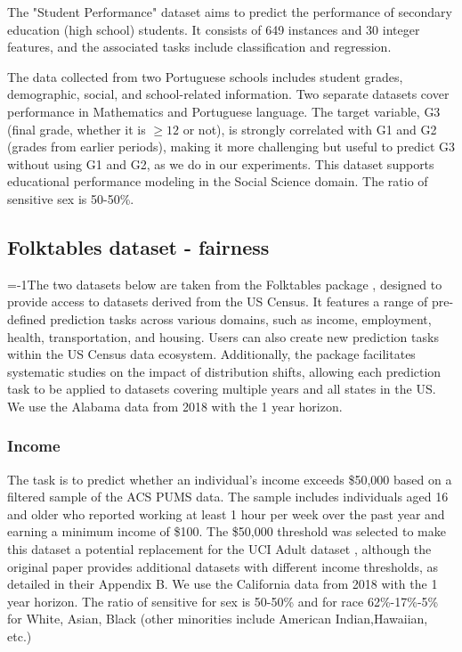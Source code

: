 The "Student Performance" dataset \citep{cortez2008student} aims to predict the performance of secondary education (high school) students. It consists of 649 instances and 30 integer features, and the associated tasks include classification and regression.

The data collected from two Portuguese schools includes student grades, demographic, social, and school-related information. Two separate datasets cover performance in Mathematics and Portuguese language. The target variable, G3 (final grade, whether it is $\geq12$ or not), is strongly correlated with G1 and G2 (grades from earlier periods), making it more challenging but useful to predict G3 without using G1 and G2, as we do in our experiments. This dataset supports educational performance modeling in the Social Science domain. The ratio of sensitive sex is 50-50\%.


\subsection{Folktables dataset - fairness}

\looseness=-1The two datasets below are taken from the Folktables package \citep{ding2021retiringASCIfolktables}, designed to provide access to datasets derived from the US Census. It features a range of pre-defined prediction tasks across various domains, such as income, employment, health, transportation, and housing. Users can also create new prediction tasks within the US Census data ecosystem. Additionally, the package facilitates systematic studies on the impact of distribution shifts, allowing each prediction task to be applied to datasets covering multiple years and all states in the US. We use the Alabama data from 2018 with the 1 year horizon. 

\subsubsection{Income}

The task is to predict whether an individual’s income exceeds \$50,000 based on a filtered sample of the ACS PUMS data. The sample includes individuals aged 16 and older who reported working at least 1 hour per week over the past year and earning a minimum income of \$100. The \$50,000 threshold was selected to make this dataset a potential replacement for the UCI Adult dataset \citep{kohavi1994data}, although the original paper provides additional datasets with different income thresholds, as detailed in their Appendix B. We use the California data from 2018 with the 1 year horizon. The ratio of sensitive for sex is 50-50\% and for race 62\%-17\%-5\% for White, Asian, Black (other minorities include American Indian,Hawaiian, etc.)


